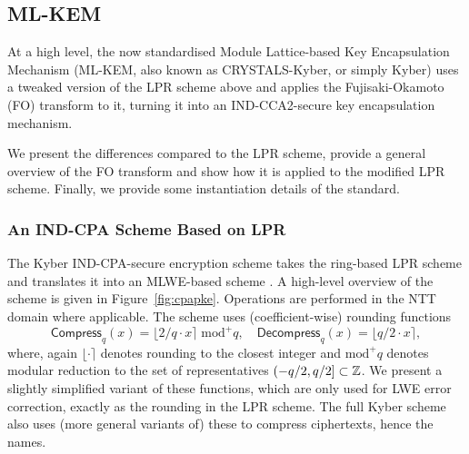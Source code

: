 \subsection{ML-KEM}
At a high level, the now standardised Module Lattice-based Key Encapsulation Mechanism (ML-KEM, also known as CRYSTALS-Kyber, or simply Kyber) uses a tweaked version of the LPR scheme above and applies the Fujisaki-Okamoto (FO) transform to it, turning it into an IND-CCA2-secure key encapsulation mechanism. 

We present the differences compared to the LPR scheme, provide a general overview of the FO transform and show how it is applied to the modified LPR scheme. Finally, we provide some instantiation details of the standard.

\subsubsection{An IND-CPA Scheme Based on LPR}
The Kyber IND-CPA-secure encryption scheme takes the ring-based LPR scheme and translates it into an MLWE-based scheme \cite{kyberpaper}. A high-level overview of the scheme is given in Figure~\ref{fig:cpapke}. Operations are performed in the NTT domain where applicable. The scheme uses (coefficient-wise) rounding functions \[ \mathsf{Compress}_q(x) = \lfloor 2/q \cdot x \rceil \; \mathrm{mod}^+ q, \quad \mathsf{Decompress}_q(x) = \lfloor q/2 \cdot x \rceil, \]
where, again $\lfloor \cdot \rceil$ denotes rounding to the closest integer and $\mathrm{mod}^+ q$ denotes modular reduction to the set of representatives $(-q/2, q/2] \subset \mathbb{Z}$. We present a slightly simplified variant of these functions, which are only used for LWE error correction, exactly as the rounding in the LPR scheme. The full Kyber scheme also uses (more general variants of) these to compress ciphertexts, hence the names.

